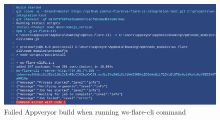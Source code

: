 \begin{figure}[H]
  \centering
    \includegraphics[width=1\textwidth]{figures/experiments/experiment-3/appveyor-output-failed.png}
    \caption{Failed Appveryor build when running ws-flare-cli command}
    \label{fig:experiment-3-appveyor-log-failed}
\end{figure}